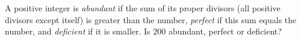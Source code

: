 A positive integer is \emph{abundant} if the sum of its proper divisors (all positive divisors except itself) is greater than the number, \emph{perfect} if this sum equals the number, and \emph{deficient} if it is smaller. Is $200$ abundant, perfect or deficient?
